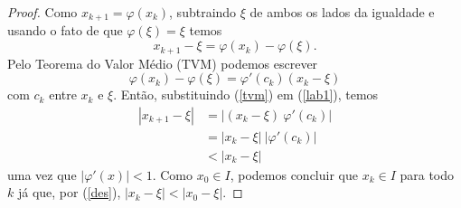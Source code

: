 \begin{proof}
Como $x_{k+1} = \varphi(x_k)$, subtraindo $\xi$ de ambos os lados da igualdade e usando o fato de que $\varphi(\xi)=\xi$ temos
    \begin{equation}\label{lab1}
        x_{k+1} - \xi = \varphi(x_k) - \varphi(\xi).
    \end{equation}
    Pelo Teorema do Valor Médio (TVM) podemos escrever \\
    \begin{equation}\label{tvm}
        \varphi(x_k) - \varphi(\xi) = \varphi'(c_k) (x_k - \xi)
    \end{equation}
    com $c_k$ entre $x_k$ e $\xi$. Então, substituindo (\ref{tvm}) em (\ref{lab1}), temos
    \begin{align}\label{des}
        |x_{k+1} - \xi| &= |(x_k - \xi) \ \varphi'(c_k)| \nonumber \\
        &= |x_k - \xi| \ |\varphi'(c_k)| \\
        &< |x_k - \xi| \nonumber
    \end{align}
    uma vez que $|\varphi'(x)| < 1$. Como $x_0 \in I$, podemos concluir que $x_k \in I$ para todo $k$ já que, por (\ref{des}), $|x_k - \xi| < |x_0 - \xi|$. 


\end{proof}
